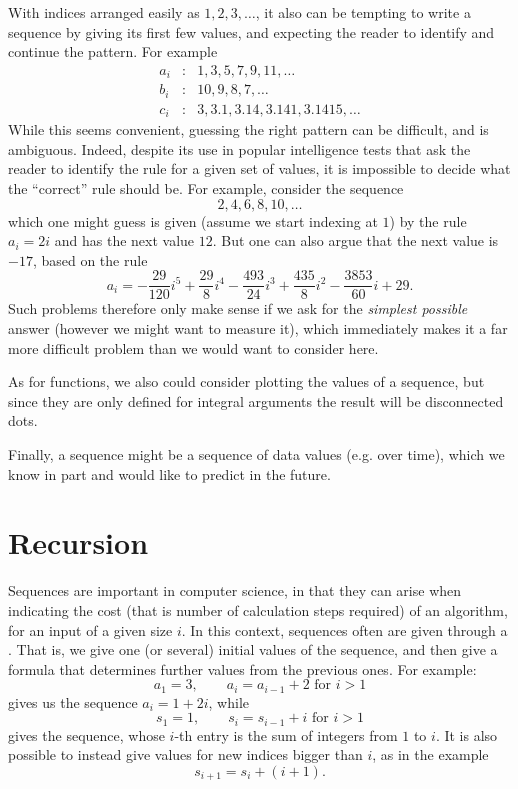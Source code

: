 With indices arranged easily as $1,2,3,\ldots$, it also can be tempting to write a sequence by
giving its first few values, and expecting the reader to identify and continue the
pattern. For example
\begin{eqnarray*}
a_i&:&1,3,5,7,9,11,\ldots\\
b_i&:&10,9,8,7,\ldots\\
c_i&:&3, 3.1, 3.14, 3.141, 3.1415,\ldots
\end{eqnarray*}
While this seems convenient, guessing the right pattern can be difficult, and
is ambiguous. Indeed, despite its use in popular intelligence tests that ask
the reader to identify the rule for a given set of values, it is impossible
to decide what the ``correct'' rule should be. For example, consider the
sequence
\[
2,4,6,8,10,\ldots
\]
which one might guess is given (assume we start indexing at $1$) by the rule $a_i=2i$
and has the next value $12$. But one can also argue that the next value is $-17$, based
on the rule
\[
a_i=-\frac{29}{120}i^{5}+\frac{29}{8}i^{4}-\frac{493}{24}i^{3}+\frac{435}{8}i^{2}
-\frac{3853}{60}i+29.
\]
Such problems therefore only make sense if we ask for the {\em simplest possible} answer
(however we might want to measure it), which immediately makes it a far more difficult
problem than we would want to consider here.
\medskip

As for functions, we also could consider plotting the values of a sequence, but since
they are only defined for integral arguments the result will be disconnected dots.

Finally, a sequence might be a sequence of data values (e.g. over time), which we know
in part and would like to predict in the future.

\section{Recursion}

Sequences are important in computer science, in that they can arise when indicating the
cost (that is number of calculation steps required) of an algorithm, for an input of a
given size $i$. In this context, sequences often are given through a .
That is, we give one (or several) initial values of the sequence, and then give a
formula that determines further values from the previous ones. For example:
\[
a_1=3,\qquad a_i=a_{i-1}+2\mbox{\ for $i>1$}
\]
gives us the sequence $a_i=1+2i$, while
\[
s_1=1,\qquad s_i=s_{i-1}+i\mbox{\ for $i>1$}
\]
gives the sequence, whose $i$-th entry is the sum of integers from $1$ to $i$. It is
also possible to instead give values for new indices bigger than $i$, as in the example
\[
s_{i+1}=s_i+(i+1).
\]

